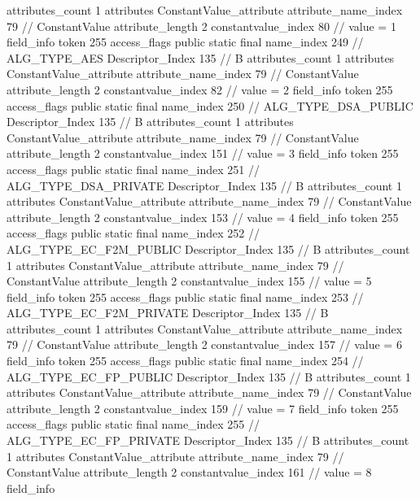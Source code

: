 {{{{{				attributes_count	1
				attributes {
				ConstantValue_attribute {
					attribute_name_index	79		// ConstantValue
					attribute_length	2
					constantvalue_index	80		// value = 1
				}
				}
			}
			field_info {
				token	255
				access_flags	public static final
				name_index	249		// ALG_TYPE_AES
				Descriptor_Index	135		// B
				attributes_count	1
				attributes {
				ConstantValue_attribute {
					attribute_name_index	79		// ConstantValue
					attribute_length	2
					constantvalue_index	82		// value = 2
				}
				}
			}
			field_info {
				token	255
				access_flags	public static final
				name_index	250		// ALG_TYPE_DSA_PUBLIC
				Descriptor_Index	135		// B
				attributes_count	1
				attributes {
				ConstantValue_attribute {
					attribute_name_index	79		// ConstantValue
					attribute_length	2
					constantvalue_index	151		// value = 3
				}
				}
			}
			field_info {
				token	255
				access_flags	public static final
				name_index	251		// ALG_TYPE_DSA_PRIVATE
				Descriptor_Index	135		// B
				attributes_count	1
				attributes {
				ConstantValue_attribute {
					attribute_name_index	79		// ConstantValue
					attribute_length	2
					constantvalue_index	153		// value = 4
				}
				}
			}
			field_info {
				token	255
				access_flags	public static final
				name_index	252		// ALG_TYPE_EC_F2M_PUBLIC
				Descriptor_Index	135		// B
				attributes_count	1
				attributes {
				ConstantValue_attribute {
					attribute_name_index	79		// ConstantValue
					attribute_length	2
					constantvalue_index	155		// value = 5
				}
				}
			}
			field_info {
				token	255
				access_flags	public static final
				name_index	253		// ALG_TYPE_EC_F2M_PRIVATE
				Descriptor_Index	135		// B
				attributes_count	1
				attributes {
				ConstantValue_attribute {
					attribute_name_index	79		// ConstantValue
					attribute_length	2
					constantvalue_index	157		// value = 6
				}
				}
			}
			field_info {
				token	255
				access_flags	public static final
				name_index	254		// ALG_TYPE_EC_FP_PUBLIC
				Descriptor_Index	135		// B
				attributes_count	1
				attributes {
				ConstantValue_attribute {
					attribute_name_index	79		// ConstantValue
					attribute_length	2
					constantvalue_index	159		// value = 7
				}
				}
			}
			field_info {
				token	255
				access_flags	public static final
				name_index	255		// ALG_TYPE_EC_FP_PRIVATE
				Descriptor_Index	135		// B
				attributes_count	1
				attributes {
				ConstantValue_attribute {
					attribute_name_index	79		// ConstantValue
					attribute_length	2
					constantvalue_index	161		// value = 8
				}
				}
			}
			field_info {
}}}}}
